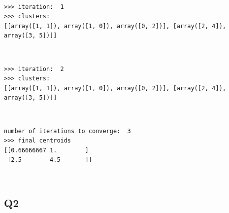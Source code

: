 \documentclass[11pt]{article}
\begin{document}
    \begin{center}
    \end{center}
    { \hspace*{\fill} \\}
    
    \begin{Verbatim}[commandchars=\\\{\}]
>>> iteration:  1
>>> clusters:
[[array([1, 1]), array([1, 0]), array([0, 2])], [array([2, 4]), array([3, 5])]]

    \end{Verbatim}

    \begin{center}
    \end{center}
    { \hspace*{\fill} \\}
    
    \begin{Verbatim}[commandchars=\\\{\}]
>>> iteration:  2
>>> clusters:
[[array([1, 1]), array([1, 0]), array([0, 2])], [array([2, 4]), array([3, 5])]]

    \end{Verbatim}

    \begin{center}
    \end{center}
    { \hspace*{\fill} \\}
    
    \begin{Verbatim}[commandchars=\\\{\}]
number of iterations to converge:  3
>>> final centroids
[[0.66666667 1.        ]
 [2.5        4.5       ]]

    \end{Verbatim}

    \begin{center}
    \end{center}
    { \hspace*{\fill} \\}
    
    \subsection*{Q2}\label{q2}
\end{document}

